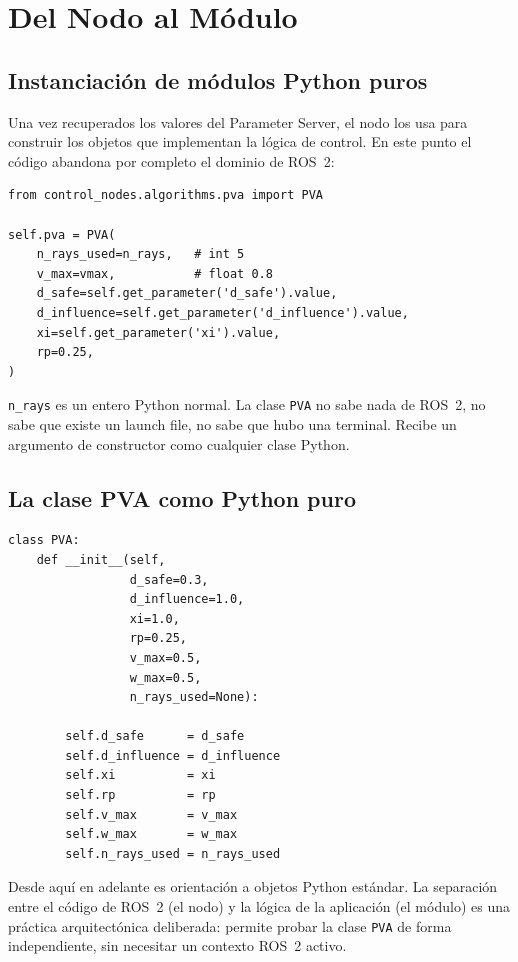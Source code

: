 \section{Del Nodo al Módulo}

\subsection{Instanciación de módulos Python puros}

Una vez recuperados los valores del Parameter Server, el nodo los usa para construir los objetos que implementan la lógica de control. En este punto el código abandona por completo el dominio de ROS~2:

\begin{lstlisting}[style=python, caption={Instanciación del módulo PVA desde el nodo.}]
from control_nodes.algorithms.pva import PVA

self.pva = PVA(
    n_rays_used=n_rays,   # int 5
    v_max=vmax,           # float 0.8
    d_safe=self.get_parameter('d_safe').value,
    d_influence=self.get_parameter('d_influence').value,
    xi=self.get_parameter('xi').value,
    rp=0.25,
)
\end{lstlisting}

\texttt{n\_rays} es un entero Python normal. La clase \texttt{PVA} no sabe nada de ROS~2, no sabe que existe un launch file, no sabe que hubo una terminal. Recibe un argumento de constructor como cualquier clase Python.

\subsection{La clase PVA como Python puro}

\begin{lstlisting}[style=python, caption={Constructor de la clase \texttt{PVA}.}]
class PVA:
    def __init__(self,
                 d_safe=0.3,
                 d_influence=1.0,
                 xi=1.0,
                 rp=0.25,
                 v_max=0.5,
                 w_max=0.5,
                 n_rays_used=None):

        self.d_safe      = d_safe
        self.d_influence = d_influence
        self.xi          = xi
        self.rp          = rp
        self.v_max       = v_max
        self.w_max       = w_max
        self.n_rays_used = n_rays_used
\end{lstlisting}

Desde aquí en adelante es orientación a objetos Python estándar. La separación entre el código de ROS~2 (el nodo) y la lógica de la aplicación (el módulo) es una práctica arquitectónica deliberada: permite probar la clase \texttt{PVA} de forma independiente, sin necesitar un contexto ROS~2 activo.


